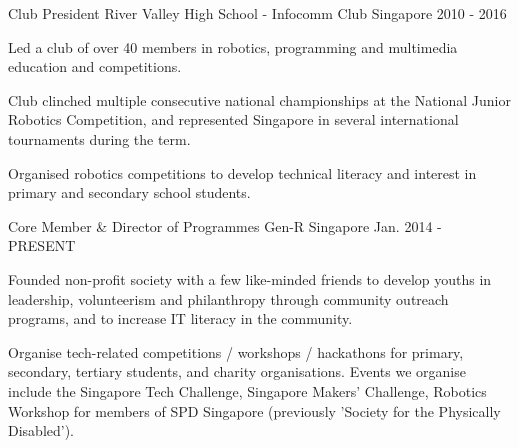 

\begin{cventries}

  \cventry
    {Club President} %
    {River Valley High School - Infocomm Club} %
    {Singapore} %
    {2010 - 2016} %
    {
      \begin{cvitems} %
        \item {Led a club of over 40 members in robotics, programming and multimedia education and competitions.}
        \item {Club clinched multiple consecutive national championships at the National Junior Robotics Competition, and represented Singapore in several international tournaments during the term.}
        \item {Organised robotics competitions to develop technical literacy and interest in primary and secondary school students.}
      \end{cvitems}
    }

  \cventry
    {Core Member \& Director of Programmes} %
    {Gen-R} %
    {Singapore} %
    {Jan. 2014 - PRESENT} %
    {
      \begin{cvitems} %
        \item {Founded non-profit society with a few like-minded friends to develop youths in leadership, volunteerism and philanthropy through community outreach programs, and to increase IT literacy in the community.}
        \item {Organise tech-related competitions / workshops / hackathons for primary, secondary, tertiary students, and charity organisations. Events we organise include the Singapore Tech Challenge, Singapore Makers' Challenge, Robotics Workshop for members of SPD Singapore (previously 'Society for the Physically Disabled').}
      \end{cvitems}
    }


\end{cventries}
